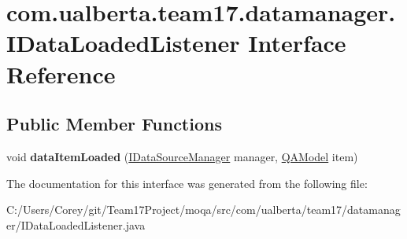 \hypertarget{interfacecom_1_1ualberta_1_1team17_1_1datamanager_1_1_i_data_loaded_listener}{\section{com.\+ualberta.\+team17.\+datamanager.\+I\+Data\+Loaded\+Listener Interface Reference}
\label{interfacecom_1_1ualberta_1_1team17_1_1datamanager_1_1_i_data_loaded_listener}
}
\subsection*{Public Member Functions}
\begin{DoxyCompactItemize}
\item 
\hypertarget{interfacecom_1_1ualberta_1_1team17_1_1datamanager_1_1_i_data_loaded_listener_a4f5b6ad818837808fdd129f8c2ebd566}{void {\bfseries data\+Item\+Loaded} (\hyperlink{interfacecom_1_1ualberta_1_1team17_1_1datamanager_1_1_i_data_source_manager}{I\+Data\+Source\+Manager} manager, \hyperlink{classcom_1_1ualberta_1_1team17_1_1_q_a_model}{Q\+A\+Model} item)}\label{interfacecom_1_1ualberta_1_1team17_1_1datamanager_1_1_i_data_loaded_listener_a4f5b6ad818837808fdd129f8c2ebd566}

\end{DoxyCompactItemize}


The documentation for this interface was generated from the following file\+:\begin{DoxyCompactItemize}
\item 
C\+:/\+Users/\+Corey/git/\+Team17\+Project/moqa/src/com/ualberta/team17/datamanager/I\+Data\+Loaded\+Listener.\+java\end{DoxyCompactItemize}

